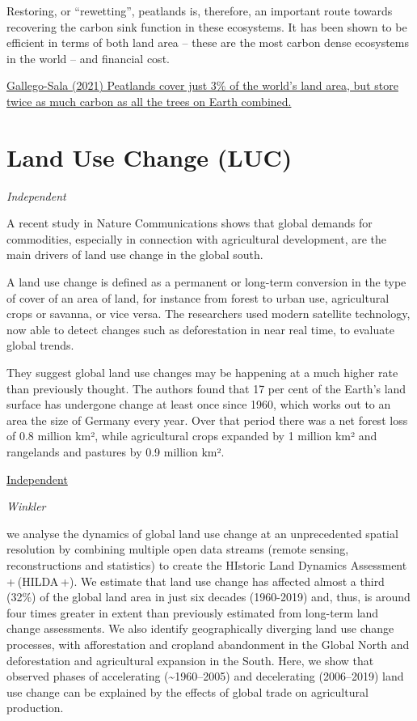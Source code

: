 \documentclass[
]{book}
\begin{document}
Restoring, or ``rewetting'', peatlands is, therefore, an important route towards recovering the carbon sink function in these ecosystems. It has been shown to be efficient in terms of both land area -- these are the most carbon dense ecosystems in the world -- and financial cost.

\href{https://www.carbonbrief.org/guest-post-are-the-worlds-peatlands-better-protected-after-cop26}{Gallego-Sala (2021) Peatlands cover just 3\% of the world's land area, but store twice as much carbon as all the trees on Earth combined.}

\hypertarget{land-use-change-luc}{%
\section{Land Use Change (LUC)}\label{land-use-change-luc}}

\emph{Independent}

A recent study in Nature Communications shows that global demands for commodities, especially in connection with agricultural development, are the main drivers of land use change in the global south.

A land use change is defined as a permanent or long-term conversion in the type of cover of an area of land, for instance from forest to urban use, agricultural crops or savanna, or vice versa. The researchers used modern satellite technology, now able to detect changes such as deforestation in near real time, to evaluate global trends.

They suggest global land use changes may be happening at a much higher rate than previously thought. The authors found that 17 per cent of the Earth's land surface has undergone change at least once since 1960, which works out to an area the size of Germany every year. Over that period there was a net forest loss of 0.8 million km², while agricultural crops expanded by 1 million km² and rangelands and pastures by 0.9 million km².

\href{https://www.independent.co.uk/news/science/cause-deforestation-world-global-markets-b1865516.html}{Independent}

\emph{Winkler}

we analyse the dynamics of global land use change at an unprecedented spatial resolution by combining multiple open data streams (remote sensing, reconstructions and statistics) to create the HIstoric Land Dynamics Assessment + (HILDA +). We estimate that land use change has affected almost a third (32\%) of the global land area in just six decades (1960-2019) and, thus, is around four times greater in extent than previously estimated from long-term land change assessments. We also identify geographically diverging land use change processes, with afforestation and cropland abandonment in the Global North and deforestation and agricultural expansion in the South. Here, we show that observed phases of accelerating (\textasciitilde1960--2005) and decelerating (2006--2019) land use change can be explained by the effects of global trade on agricultural production.
\end{document}
